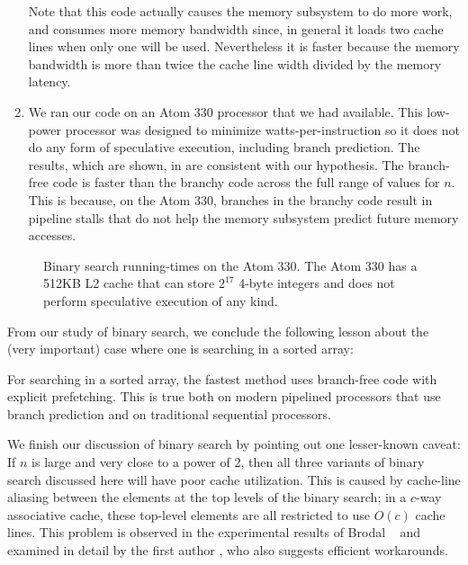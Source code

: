 \documentclass{patmorin}
\begin{document}
\begin{enumerate}
   Note that this code actually causes the memory subsystem to do more
   work, and consumes more memory bandwidth since, in general it loads
   two cache lines when only one will be used.  Nevertheless it is faster
   because the memory bandwidth is more than twice the cache line width
   divided by the memory latency.

\item We ran our code on an Atom 330 processor that we had available. This
   low-power processor was designed to minimize watts-per-instruction
   so it does not do any form of speculative execution, including
   branch prediction. The results, which are shown, in 
   are consistent with our hypothesis.  The branch-free code is faster
   than the branchy code across the full range of values for $n$.
   This is because, on the Atom 330, branches in the branchy code result
   in pipeline stalls that do not help the memory subsystem predict
   future memory accesses.
\end{enumerate}

\begin{figure}
   \caption{Binary search running-times on the Atom 330. The Atom 330
   has a 512KB L2 cache that can store $2^{17}$ 4-byte integers and does
   not perform speculative execution of any kind.}
\end{figure}

From our study of binary search, we conclude the following lesson about
the (very important) case where one is searching in a sorted array:

\begin{lesson}
  For searching in a sorted array, the fastest method uses branch-free
  code with explicit prefetching.  This is true both on modern pipelined
  processors that use branch prediction and on traditional sequential
  processors.
\end{lesson}

We finish our discussion of binary search by pointing out one lesser-known
caveat:  If $n$ is large and very close to a power of 2, then all
three variants of binary search discussed here will have poor cache
utilization.  This is caused by cache-line aliasing between the elements
at the top levels of the binary search; in a $c$-way associative cache,
these top-level elements are all restricted to use $O(c)$ cache lines.
This problem is observed in the experimental results of Brodal \etal\
\cite[Section~4.2]{brodal.fagerberg.ea:cache} and examined in detail
by the first author \cite{khuong:binary}, who also suggests efficient
workarounds.
\end{document}

